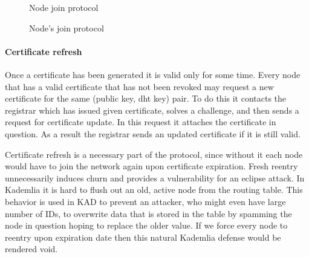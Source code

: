 \begin{figure}[tbp]
\begin{msc}{Node join protocol}
\setlength{\instdist}{5.5cm}
\setlength{\envinstdist}{3cm}
\setlength{\instwidth}{2.5cm}
\nextlevel
{}
\nextlevel[5]
\nextlevel
{}
\nextlevel[1]


\nextlevel[6]


\nextlevel


\nextlevel[2]
\nextlevel[1]
\end{msc}
\caption{Node's join protocol}
\label{fig:node_join_prot}
\end{figure}

\paragraph{Certificate refresh} Once a certificate has been generated it is
valid only for some time. Every node that has a valid certificate that has not
been revoked may request a new certificate for the same (public key, dht key)
pair.
To do this it contacts the registrar which has issued given certificate,
solves a challenge, and then sends a request for certificate update.
In this request it attaches the certificate in question. As a result the
registrar sends an updated certificate if it is still valid.

Certificate refresh is a necessary part of the protocol, since without it each
node would have to join the network again upon certificate expiration.
Fresh reentry unnecessarily induces churn and provides a vulnerability for an
eclipse attack. 
In Kademlia it is hard to flush out an old, active node from the routing table.
This behavior is used in KAD to prevent an attacker, who might even have large
number of IDs, to overwrite data that is stored in the table by spamming the
node in question hoping to replace the older value. If we force every node to
reentry upon expiration date then this natural Kademlia defense would be
rendered void.

